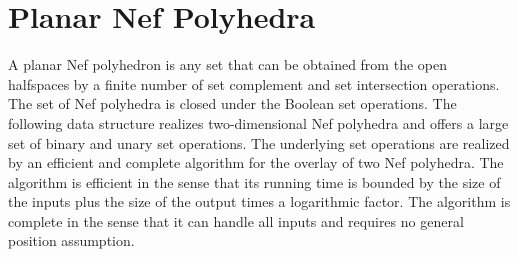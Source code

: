 \chapter{Planar Nef Polyhedra}

A planar Nef polyhedron is any set that can be obtained from the open
halfspaces by a finite number of set complement and set intersection
operations. The set of Nef polyhedra is closed under the Boolean set
operations.  The following data structure realizes two-dimensional
Nef polyhedra and offers a large set of binary and unary set
operations. The underlying set operations are realized by an efficient
and complete algorithm for the overlay of two Nef polyhedra. The
algorithm is efficient in the sense that its running time is bounded
by the size of the inputs plus the size of the output times a
logarithmic factor. The algorithm is complete in the sense that it can
handle all inputs and requires no general position assumption.


